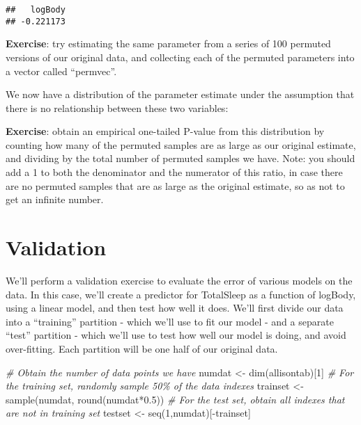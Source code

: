 \documentclass[
]{book}
\newenvironment{Shaded}{\begin{snugshade}}{\end{snugshade}}
\newcommand{\AttributeTok}[1]{\textcolor[rgb]{0.77,0.63,0.00}{#1}}
\newcommand{\CommentTok}[1]{\textcolor[rgb]{0.56,0.35,0.01}{\textit{#1}}}
\newcommand{\DecValTok}[1]{\textcolor[rgb]{0.00,0.00,0.81}{#1}}
\newcommand{\FloatTok}[1]{\textcolor[rgb]{0.00,0.00,0.81}{#1}}
\newcommand{\FunctionTok}[1]{\textcolor[rgb]{0.00,0.00,0.00}{#1}}
\newcommand{\NormalTok}[1]{#1}
\newcommand{\OtherTok}[1]{\textcolor[rgb]{0.56,0.35,0.01}{#1}}
\newcommand{\SpecialCharTok}[1]{\textcolor[rgb]{0.00,0.00,0.00}{#1}}
\begin{document}
\begin{Shaded}
\end{Shaded}

\begin{verbatim}
##   logBody 
## -0.221173
\end{verbatim}

\textbf{Exercise}: try estimating the same parameter from a series of 100 permuted versions of our original data, and collecting each of the permuted parameters into a vector called ``permvec''.

We now have a distribution of the parameter estimate under the assumption that there is no relationship between these two variables:

\textbf{Exercise}: obtain an empirical one-tailed P-value from this distribution by counting how many of the permuted samples are as large as our original estimate, and dividing by the total number of permuted samples we have. Note: you should add a 1 to both the denominator and the numerator of this ratio, in case there are no permuted samples that are as large as the original estimate, so as not to get an infinite number.

\hypertarget{validation}{%
\section{Validation}\label{validation}}

We'll perform a validation exercise to evaluate the error of various models on the data. In this case, we'll create a predictor for TotalSleep as a function of logBody, using a linear model, and then test how well it does. We'll first divide our data into a ``training'' partition - which we'll use to fit our model - and a separate ``test'' partition - which we'll use to test how well our model is doing, and avoid over-fitting. Each partition will be one half of our original data.

\begin{Shaded}
\begin{Highlighting}[]
\CommentTok{\# Obtain the number of data points we have}
\NormalTok{numdat }\OtherTok{\textless{}{-}} \FunctionTok{dim}\NormalTok{(allisontab)[}\DecValTok{1}\NormalTok{]}
\CommentTok{\# For the training set, randomly sample 50\% of the data indexes}
\NormalTok{trainset }\OtherTok{\textless{}{-}} \FunctionTok{sample}\NormalTok{(numdat, }\FunctionTok{round}\NormalTok{(numdat}\SpecialCharTok{*}\FloatTok{0.5}\NormalTok{))}
\CommentTok{\# For the test set, obtain all indexes that are not in training set}
\NormalTok{testset }\OtherTok{\textless{}{-}} \FunctionTok{seq}\NormalTok{(}\DecValTok{1}\NormalTok{,numdat)[}\SpecialCharTok{{-}}\NormalTok{trainset]}
\end{Highlighting}
\end{Shaded}
\end{document}
